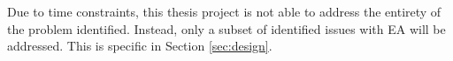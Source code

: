 Due to time constraints, this thesis project is not able to address the entirety of the problem identified. Instead, only a subset of identified issues with EA will be addressed. This is specific in Section \ref{sec:design}.